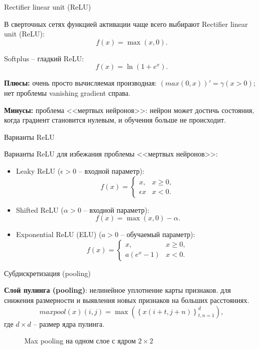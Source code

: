 \documentclass[11pt, intlimits]{beamer}
\begin{document}
\begin{frame}{Rectifier linear unit (ReLU)}

В сверточных сетях функцией активации чаще всего выбирают Rectifier linear unit (ReLU): $$f(x)=\max(x, 0).$$

Softplus -- гладкий ReLU:
$$
f(x)=\ln(1+e^x).
$$

\textbf{Плюсы:} очень просто вычисляемая производная: $(max(0, x))'=\gamma(x>0)$; нет проблемы vanishing gradient справа.

\textbf{Минусы:} проблема <<мертвых нейронов>>: нейрон может достичь состояния, когда градиент становится нулевым, и обучения больше не происходит.

\end{frame}

\begin{frame}{Варианты ReLU}

Варианты ReLU для избежания проблемы <<мертвых нейронов>>:
\begin{itemize}

\item Leaky ReLU ($\epsilon > 0$ -- входной параметр): 
$$
f(x)=
\begin{cases}
x, & x \ge 0, \\
\epsilon x & x < 0.
\end{cases}
$$

\item Shifted ReLU ($\alpha > 0$ -- входной параметр): 
$$
f(x)=\max(x, 0) - \alpha.
$$

\item Exponential ReLU (ELU) ($a > 0$ -- обучаемый параметр):
$$
f(x)=
\begin{cases}
x, & x \ge 0, \\
a(e^x-1) & x < 0.
\end{cases}
$$

\end{itemize}

\end{frame}

\begin{frame}{Субдискретизация (pooling)}

\textbf{Слой пулинга (pooling)}: нелинейное уплотнение карты признаков. для снижения размерности и выявления новых признаков на больших расстояниях.
$$
maxpool(x)(i, j)=\max\left(\left\{x(i+t,j+n)\right\}_{t,n=1}^{d}\right),
$$
где $d \times d$ -- размер ядра пулинга. 

\begin{figure}[h]
\caption{Max pooling на одном слое с ядром $2 \times 2$}
\label{img:lenet}
\end{figure}
\end{frame}
\end{document}
